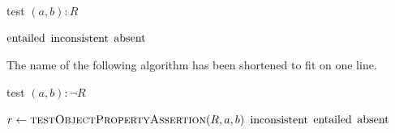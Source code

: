 \documentclass[paper.tex]{subfiles}
\begin{document}
\begin{algorithm}[H]
  \caption{test $(a, b) : R$}
  \begin{algorithmic}[1]
    \raggedright
        \State \Return $\mathrm{entailed}$
      \Else
            \State \Return $\mathrm{inconsistent}$
          \EndIf
        \EndFor
        \State \Return $\mathrm{absent}$
      \EndIf
    \EndFunction
  \end{algorithmic}
\end{algorithm}

The name of the following algorithm has been shortened to fit on one line.

\begin{algorithm}[H]
  \caption{test $(a, b) : \neg R$}
  \begin{algorithmic}[1]
    \raggedright
      \State $r \gets \Call{testObjectPropertyAssertion}{R, a, b}$
        \State \Return $\mathrm{inconsistent}$
        \State \Return $\mathrm{entailed}$
      \Else
        \State \Return $\mathrm{absent}$
      \EndIf
    \EndFunction
  \end{algorithmic}
\end{algorithm}
\end{document}
